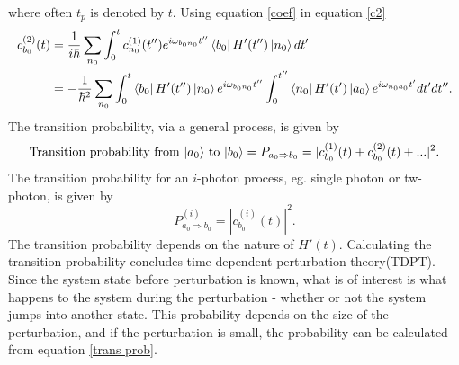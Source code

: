 where often $t_p$ is denoted by $t$. Using equation \eqref{coef} in equation \eqref{c2}
\begin{equation}
	\begin{split}
		c^{(2)}_{b_0}(t)&=\frac{1}{i\hbar}\sum_{n_0}^{}\int_{0}^{t}c^{(1)}_{n_0}(t'') e^{i\omega_{b_0n_0}t''}\bra{b_0}H'(t'')\ket{n_0}dt'
		\\
		&=-\frac{1}{\hbar^2}\sum_{n_0}\int_{0}^{t}\bra{b_0}H'(t'')\ket{n_0}e^{i\omega_{b_0n_0}t''}\int_{0}^{t''}\bra{n_0}H'(t')\ket{a_0}e^{i\omega_{n_0a_0}t'}dt'dt''.
		\\
	\end{split}
	\label{second order}
\end{equation} 
The transition probability, via a general process, is given by
\begin{equation}
	\mbox{Transition probability from $\ket{a_0}$ to $\ket{b_0}$}=P_{a_0\Rightarrow b_0}=|c^{(1)}_{b_0}(t)+c^{(2)}_{b_0}(t)+...|^2.
	\label{trans prob}
\end{equation} 
The transition probability for an $i$-photon process, eg. single photon or tw-photon, is given by
\begin{equation}
	P^{(i)}_{a_0\Rightarrow b_0}=|c^{(i)}_{b_0}(t)|^2.
\end{equation} 
The transition probability depends on the nature of $H'(t)$. Calculating the transition probability concludes time-dependent perturbation theory(TDPT). Since the system state before perturbation is known, what is of interest is what happens to the system during the perturbation - whether or not the system jumps into another state. This probability depends on the size of the perturbation, and if the perturbation is small, the probability can be calculated from equation \eqref{trans prob}. 

